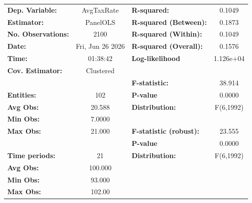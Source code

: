 \begin{center}
\begin{tabular}{lclc}
\toprule
\textbf{Dep. Variable:}                       &     AvgTaxRate     & \textbf{  R-squared:         }   &      0.1049      \\
\textbf{Estimator:}                           &      PanelOLS      & \textbf{  R-squared (Between):}  &      0.1873      \\
\textbf{No. Observations:}                    &        2100        & \textbf{  R-squared (Within):}   &      0.1049      \\
\textbf{Date:}                                &  Fri, Jun 26 2026  & \textbf{  R-squared (Overall):}  &      0.1576      \\
\textbf{Time:}                                &      01:38:42      & \textbf{  Log-likelihood     }   &    1.126e+04     \\
\textbf{Cov. Estimator:}                      &     Clustered      & \textbf{                     }   &                  \\
\textbf{}                                     &                    & \textbf{  F-statistic:       }   &      38.914      \\
\textbf{Entities:}                            &        102         & \textbf{  P-value            }   &      0.0000      \\
\textbf{Avg Obs:}                             &       20.588       & \textbf{  Distribution:      }   &    F(6,1992)     \\
\textbf{Min Obs:}                             &       7.0000       & \textbf{                     }   &                  \\
\textbf{Max Obs:}                             &       21.000       & \textbf{  F-statistic (robust):} &      23.555      \\
\textbf{}                                     &                    & \textbf{  P-value            }   &      0.0000      \\
\textbf{Time periods:}                        &         21         & \textbf{  Distribution:      }   &    F(6,1992)     \\
\textbf{Avg Obs:}                             &      100.000       & \textbf{                     }   &                  \\
\textbf{Min Obs:}                             &       93.000       & \textbf{                     }   &                  \\
\textbf{Max Obs:}                             &       102.00       & \textbf{                     }   &                  \\

\end{tabular}
\end{center}
